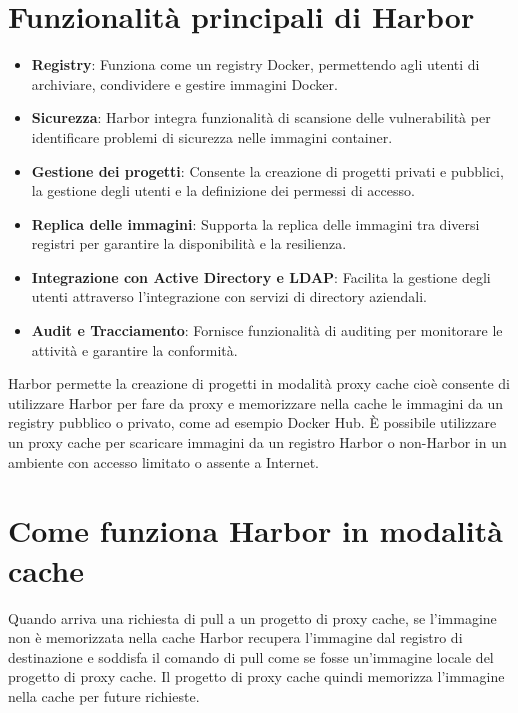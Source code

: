 \documentclass[12pt]{report}
\begin{document}
\section{Funzionalità principali di Harbor}
\begin{itemize}
    \item \textbf{Registry}: Funziona come un registry Docker, permettendo agli utenti di archiviare, condividere e gestire immagini Docker.
    \item \textbf{Sicurezza}: Harbor integra funzionalità di scansione delle vulnerabilità per identificare problemi di sicurezza nelle immagini container.
    \item \textbf{Gestione dei progetti}: Consente la creazione di progetti privati e pubblici, la gestione degli utenti e la definizione dei permessi di accesso.
    \item \textbf{Replica delle immagini}: Supporta la replica delle immagini tra diversi registri per garantire la disponibilità e la resilienza.
    \item \textbf{Integrazione con Active Directory e LDAP}: Facilita la gestione degli utenti attraverso l'integrazione con servizi di directory aziendali.
    \item \textbf{Audit e Tracciamento}: Fornisce funzionalità di auditing per monitorare le attività e garantire la conformità.
\end{itemize}
Harbor permette la creazione di progetti in modalità proxy cache cioè consente di utilizzare Harbor per fare da proxy e memorizzare nella cache le immagini da un registry pubblico o privato, come ad esempio Docker Hub. È possibile utilizzare un proxy cache per scaricare immagini da un registro Harbor o non-Harbor in un ambiente con accesso limitato o assente a Internet.
\section{Come funziona Harbor in modalità cache}
Quando arriva una richiesta di pull a un progetto di proxy cache, se l'immagine non è memorizzata nella cache Harbor recupera l'immagine dal registro di destinazione e soddisfa il comando di pull come se fosse un'immagine locale del progetto di proxy cache. Il progetto di proxy cache quindi memorizza l'immagine nella cache per future richieste.
\end{document}
